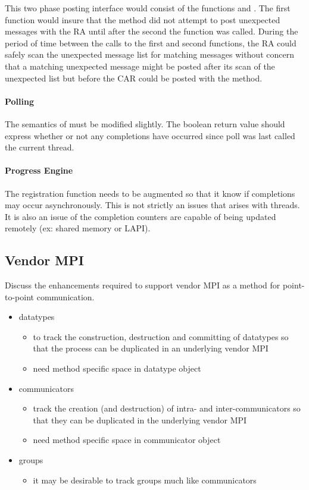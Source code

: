 This two phase posting interface would consist of the functions
 and .  The first
function would insure that the method did not attempt to post unexpected
messages with the RA until after the second the function was called.  During
the period of time between the calls to the first and second functions, the RA
could safely scan the unexpected message list for matching messages without
concern that a matching unexpected message might be posted after its scan of
the unexpected list but before the CAR could be posted with the method.

\paragraph{Polling} The semantics of  must be modified
slightly.  The boolean return value should express whether or not any
completions have occurred since poll was last called the current thread.

\paragraph{Progress Engine} The registration function needs to be augmented so
that it know if completions may occur asynchronously.  This is not strictly an
issues that arises with threads.  It is also an issue of the completion
counters are capable of being updated remotely (ex: shared memory or LAPI).


\subsection{Vendor MPI}

Discuss the enhancements required to support vendor MPI as a method for
point-to-point communication.
\begin{itemize}
\item datatypes
  \begin{itemize}
  \item to track the construction, destruction and committing of datatypes so
    that the process can be duplicated in an underlying vendor MPI
  \item need method specific space in datatype object 
  \end{itemize}
\item communicators
  \begin{itemize}
  \item track the creation (and destruction) of intra- and inter-communicators
    so that they can be duplicated in the underlying vendor MPI
  \item need method specific space in communicator object 
  \end{itemize}
\item groups
  \begin{itemize}
  \item it may be desirable to track groups much like communicators
  \end{itemize}
\end{itemize}

